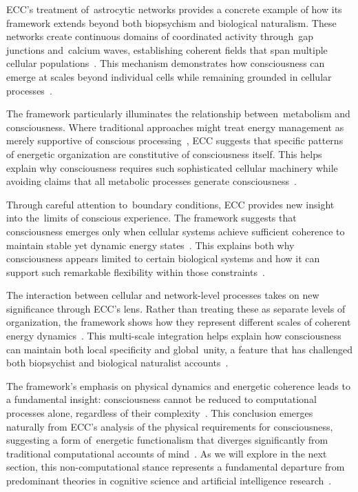ECC's treatment of~astrocytic networks provides a concrete example of how its framework extends beyond both biopsychism and biological naturalism. These networks create continuous domains of coordinated activity through~gap junctions and~calcium waves, establishing coherent fields that span multiple cellular populations~\cite{edwards2005consciousness,Bazargani2016}. This mechanism demonstrates how consciousness can emerge at scales beyond individual cells while remaining grounded in cellular processes~\cite{thompson2010mind,McFadden2020}.

The framework particularly illuminates the relationship between~metabolism and consciousness. Where traditional approaches might treat energy management as merely supportive of conscious processing~\cite{searle1992rediscovery}, ECC suggests that specific patterns of energetic organization are constitutive of consciousness itself. This helps explain why consciousness requires such sophisticated cellular machinery while avoiding claims that all metabolic processes generate consciousness~\cite{margulis2000life,pellerin2004neuroenergetics}.

Through careful attention to~boundary conditions, ECC provides new insight into the~limits of conscious experience. The framework suggests that consciousness emerges only when cellular systems achieve sufficient coherence to maintain stable yet dynamic energy states~\cite{varela1997patterns,prigogine2018order}. This explains both why consciousness appears limited to certain biological systems and how it can support such remarkable flexibility within those constraints~\cite{godfrey2016other,juarrero2023context}.

The interaction between cellular and network-level processes takes on new significance through ECC's lens. Rather than treating these as separate levels of organization, the framework shows how they represent different scales of coherent energy dynamics~\cite{lyon2015cognitive}. This multi-scale integration helps explain how consciousness can maintain both local specificity and global~unity, a feature that has challenged both biopsychist and biological naturalist accounts~\cite{clark2010supersizing}.

The framework's emphasis on physical dynamics and energetic coherence leads to a fundamental insight: consciousness cannot be reduced to computational processes alone, regardless of their complexity~\cite{thompson2010mind}. This conclusion emerges naturally from ECC's analysis of the physical requirements for consciousness, suggesting a form of~energetic functionalism that diverges significantly from traditional computational accounts of mind~\cite{piccinini2020neurocognitive,horst2011symbols}. As we will explore in the next section, this non-computational stance represents a fundamental departure from predominant theories in cognitive science and artificial intelligence research~\cite{thompson2010mind,dreyfus1992computers}.
